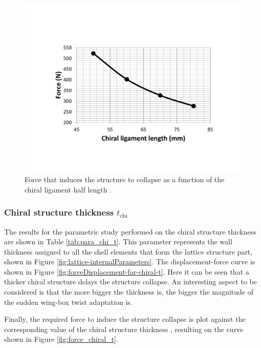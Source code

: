      \begin{figure}[!htpb] %
        \centering
        \includegraphics[width=0.8 \textwidth]{figures/result-sim/L/force_L}
        \caption[Force that induces the structure to collapse as a function of the chiral ligament half length]{Force that induces the structure to collapse as a function of the chiral ligament half length \chiL.}\label{fig:force_L}
      \end{figure}

    \clearpage
    \subsubsection{Chiral structure thickness $t_{\mathrm{chi}}$}

      The results for the parametric study performed on the chiral structure thickness \chit are shown in Table \ref{tab:para_chi_t}. This parameter represents the wall thickness assigned to all the shell elements that form the lattice structure part, shown in Figure \ref{fig:lattice-internalParameters}. The displacement-force curve is shown in Figure \ref{fig:forceDisplacement-far-chiral-t}. Here it can be seen that a thicker chiral structure delays the structure collapse. An interesting aspect to be considered is that the more bigger the thickness \chit is, the bigger the magnitude of the sudden wing-box twist adaptation is.

      Finally, the required force to induce the structure collapse is plot against the corresponding value of the chiral structure thickness \chit, resulting on the curve shown in Figure \ref{fig:force_chiral_t}.

